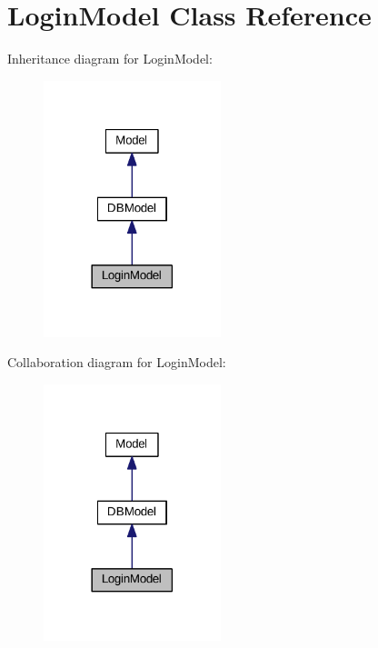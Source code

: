 \hypertarget{classLoginModel}{\section{Login\+Model Class Reference}
\label{classLoginModel}
}


Inheritance diagram for Login\+Model\+:\nopagebreak
\begin{figure}[H]
\begin{center}
\leavevmode
\includegraphics[width=146pt]{classLoginModel__inherit__graph}
\end{center}
\end{figure}


Collaboration diagram for Login\+Model\+:\nopagebreak
\begin{figure}[H]
\begin{center}
\leavevmode
\includegraphics[width=146pt]{classLoginModel__coll__graph}
\end{center}
\end{figure}
